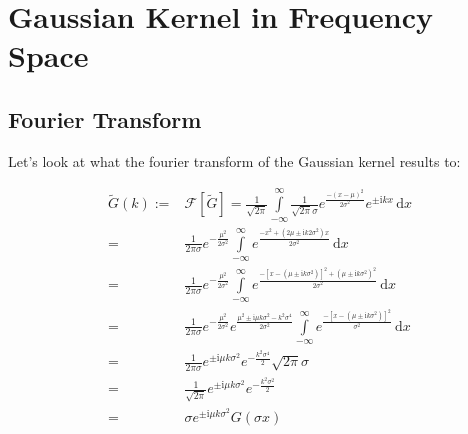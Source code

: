 \documentclass[10pt,a4paper]{article}
\begin{document}
\section{Gaussian Kernel in Frequency Space}

\subsection{Fourier Transform}

Let's look at what the fourier transform of the Gaussian kernel results to:

\begin{align}
\tilde{G}(k)
   := & \mathcal{F}\left[ \tilde{G} \right]
    =   \frac{1}{\sqrt{2\pi}}
        \int\limits_{-\infty}^{\infty} \frac{1}{\sqrt{2\pi}\sigma}
            e^{ \frac{-\left( x - \mu  \right)^2}{2\sigma^2} }
            e^{ \pm \mathrm{i}kx}
        \,\mathrm{d}x \\
    = & \frac{1}{ 2\pi\sigma } e^{-\frac{\mu^2}{2\sigma^2} }
        \int\limits_{-\infty}^{\infty}
            e^{ \frac{ -x^2 + \left(2\mu \pm \mathrm{i}k 2\sigma^2 \right)x}
                    {2\sigma^2} }
        \,\mathrm{d}x \\
    = & \frac{1}{ 2\pi\sigma } e^{-\frac{\mu^2}{2\sigma^2} }
        \int\limits_{-\infty}^{\infty}
            e^{ \frac{ -\left[ x - \left(\mu \pm
                              \mathrm{i}k\sigma^2 \right)
                       \right]^2 +
                       \left(\mu \pm \mathrm{i}k\sigma^2 \right)^2 }
                    {2\sigma^2}
              }
        \,\mathrm{d}x \\
    = & \frac{1}{ 2\pi\sigma } e^{-\frac{\mu^2}{2\sigma^2}}
        e^{\frac{ \mu^2 \pm \mathrm{i} \mu k \sigma^2 -
                  k^2\sigma^4 }{ 2 \sigma^2} }
        \int\limits_{-\infty}^{\infty}
            e^{ \frac{ -\left[ x - \left(\mu \pm
                \mathrm{i}k\sigma^2 \right) \right]^2}{\sigma^2} }
        \,\mathrm{d}x \\
    = & \frac{1}{ 2\pi\sigma }
        e^{ \pm \mathrm{i} \mu k \sigma^2 }
        e^{ -\frac{ k^2\sigma^4 }{ 2 } }
        \sqrt{ 2\pi } \sigma \\
    = & \frac{1}{ \sqrt{2\pi} }
        e^{ \pm \mathrm{i} \mu k \sigma^2  }
        e^{ -\frac{ k^2\sigma^2 }{ 2 } } \\
    = & \sigma e^{ \pm \mathrm{i} \mu k \sigma^2  } G\left( \sigma x \right)
\end{align}
\end{document}
